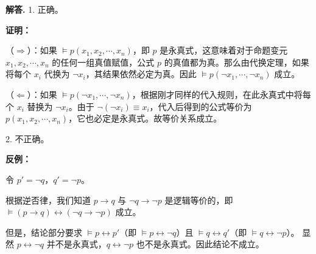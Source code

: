 \documentclass[12pt, a4paper, oneside]{ctexart}
\newenvironment{solution}{\par\noindent\textbf{解答. }}{\par}
\begin{document}
\begin{solution}
    1. 正确。
    
    \textbf{证明：}
    
    （$\Rightarrow$）：如果 $\models p(x_1, x_2, \cdots, x_n)$，即 $p$ 是永真式，这意味着对于命题变元 $x_1, x_2, \cdots, x_n$ 的任何一组真值赋值，公式 $p$ 的真值都为真。那么由代换定理，如果将每个 $x_i$ 代换为 $\lnot x_i$，其结果依然必定为真。因此 $\models p(\lnot x_1, \cdots, \lnot x_n)$ 成立。
    
    （$\Leftarrow$）：如果 $\models p(\lnot x_1, \cdots, \lnot x_n)$，根据刚才同样的代入规则，在此永真式中将每个 $x_i$ 替换为 $\lnot x_i$。由于 $\lnot(\lnot x_i) \equiv x_i$，代入后得到的公式等价为 $p(x_1, x_2, \cdots, x_n)$，它也必定是永真式。故等价关系成立。

    2. 不正确。
    
    \textbf{反例：}
    
    令 $p' = \lnot q$，$q' = \lnot p$。
    
    根据逆否律，我们知道 $p \to q$ 与 $\lnot q \to \lnot p$ 是逻辑等价的，即 $\models (p \to q) \leftrightarrow (\lnot q \to \lnot p)$ 成立。
    
    但是，结论部分要求 $\models p \leftrightarrow p'$（即 $\models p \leftrightarrow \lnot q$）且 $\models q \leftrightarrow q'$（即 $\models q \leftrightarrow \lnot p$）。
    显然 $p \leftrightarrow \lnot q$ 并不是永真式，$q \leftrightarrow \lnot p$ 也不是永真式。因此结论不成立。
\end{solution}
\end{document}
